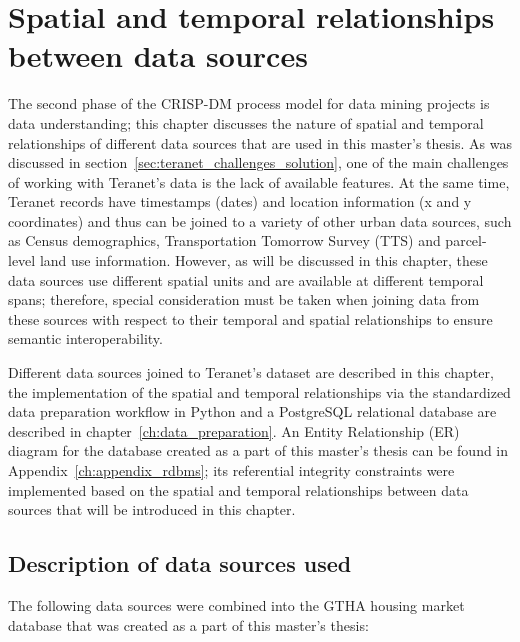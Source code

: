 \chapter{Spatial and temporal relationships between data sources} \label{ch:spatial_and_temporal_relationships}

The second phase of the CRISP-DM process model for data mining projects is data understanding;
this chapter discusses the nature of spatial and temporal relationships of different data sources that are used in this master's thesis.
As was discussed in section~\ref{sec:teranet_challenges_solution}, one of the main challenges of working with Teranet's data is the lack of available features.
At the same time, Teranet records have timestamps (dates) and location information (x and y coordinates) and thus can be joined to a variety of other urban data sources, such as Census demographics, Transportation Tomorrow Survey (TTS) and parcel-level land use information.
However, as will be discussed in this chapter, these data sources use different spatial units and are available at different temporal spans;
therefore, special consideration must be taken when joining data from these sources with respect to their temporal and spatial relationships to ensure semantic interoperability.

Different data sources joined to Teranet's dataset are described in this chapter, the implementation of the spatial and temporal relationships via the standardized data preparation workflow in Python and a PostgreSQL relational database are described in chapter~\ref{ch:data_preparation}.
An Entity Relationship (ER) diagram for the database created as a part of this master's thesis can be found in Appendix~\ref{ch:appendix_rdbms};
its referential integrity constraints were implemented based on the spatial and temporal relationships between data sources that will be introduced in this chapter.

\section{Description of data sources used} \label{sec:description_of_data_sources}

The following data sources were combined into the GTHA housing market database that was created as a part of this master's thesis:

